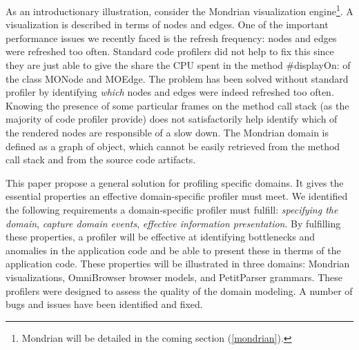 \documentclass[runningheads]{llncs}
\newcommand{\ugh}[1]{\textcolor{red}{\uwave{#1}}} %
\newcommand{\lr}[1]{\nb{Lukas}{orange}{#1}}
\newcommand{\co}[1]{{\sf #1}}
\begin{document}
As an introductionary illustration, consider the Mondrian visualization engine\footnote{Mondrian will be detailed in the coming section (\autoref{mondrian}).}. A visualization is described in terms of nodes and edges. One of the important performance issues we recently faced is the refresh frequency: nodes and edges were refreshed too often.
Standard code profilers did not help to fix this since they are just able to give the share the CPU spent in the method \co{\#displayOn:} of the class \co{MONode} and \co{MOEdge}. The problem has been solved without standard profiler by identifying \emph{which} nodes and edges were indeed refreshed too often. Knowing the presence of some particular frames on the method call stack (as the majority of code profiler provide) does not satisfactorily help identify which of the rendered nodes are responsible of a slow down. The Mondrian domain is defined as a graph of object, which cannot be easily retrieved from the method call stack and from the source code artifacts. %


This paper propose a general solution for profiling specific domains. It gives the essential properties an effective domain-specific profiler must meet. 
We identified the following requirements a domain-specific profiler must fulfill: \emph{specifying the domain}, \emph{capture domain events}, \emph{effective information presentation}. By fulfilling these properties, a profiler will be effective at identifying bottlenecks and anomalies in the application code and be able to present these in therms of the application code.
These properties will be illustrated in three domains: Mondrian visualizations, OmniBrowser browser models, and PetitParser grammars. These profilers were designed to assess the quality of the domain modeling. A number of bugs and issues have been identified and fixed.
\end{document}
